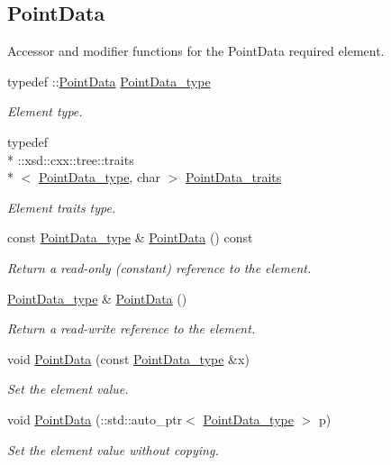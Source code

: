 \subsection*{Point\-Data}
\label{_amgrpe540450fb956cd9dbb96f979e5939d0f}%
Accessor and modifier functions for the Point\-Data required element. \begin{DoxyCompactItemize}
\item 
typedef \-::\hyperlink{classPointData}{Point\-Data} \hyperlink{classPieceUnstructuredGrid__t_a5d79d8ea03ca53f80f24e62c2175ec02}{Point\-Data\-\_\-type}
\begin{DoxyCompactList}\small\item\em Element type. \end{DoxyCompactList}\item 
typedef \\*
\-::xsd\-::cxx\-::tree\-::traits\\*
$<$ \hyperlink{classPieceUnstructuredGrid__t_a5d79d8ea03ca53f80f24e62c2175ec02}{Point\-Data\-\_\-type}, char $>$ \hyperlink{classPieceUnstructuredGrid__t_aee3c7ac7c46c4ebc9f248d31c458d300}{Point\-Data\-\_\-traits}
\begin{DoxyCompactList}\small\item\em Element traits type. \end{DoxyCompactList}\item 
const \hyperlink{classPieceUnstructuredGrid__t_a5d79d8ea03ca53f80f24e62c2175ec02}{Point\-Data\-\_\-type} \& \hyperlink{classPieceUnstructuredGrid__t_a4825627cfe05949b680c81826e9d4ea5}{Point\-Data} () const 
\begin{DoxyCompactList}\small\item\em Return a read-\/only (constant) reference to the element. \end{DoxyCompactList}\item 
\hyperlink{classPieceUnstructuredGrid__t_a5d79d8ea03ca53f80f24e62c2175ec02}{Point\-Data\-\_\-type} \& \hyperlink{classPieceUnstructuredGrid__t_af3a9955626dac2aad17bf879a77d2c0d}{Point\-Data} ()
\begin{DoxyCompactList}\small\item\em Return a read-\/write reference to the element. \end{DoxyCompactList}\item 
void \hyperlink{classPieceUnstructuredGrid__t_aee7745ad1ce39af5fc048e50acb76424}{Point\-Data} (const \hyperlink{classPieceUnstructuredGrid__t_a5d79d8ea03ca53f80f24e62c2175ec02}{Point\-Data\-\_\-type} \&x)
\begin{DoxyCompactList}\small\item\em Set the element value. \end{DoxyCompactList}\item 
void \hyperlink{classPieceUnstructuredGrid__t_a752f5abf0faba70deaab0b4990677612}{Point\-Data} (\-::std\-::auto\-\_\-ptr$<$ \hyperlink{classPieceUnstructuredGrid__t_a5d79d8ea03ca53f80f24e62c2175ec02}{Point\-Data\-\_\-type} $>$ p)
\begin{DoxyCompactList}\small\item\em Set the element value without copying. \end{DoxyCompactList}\end{DoxyCompactItemize}
